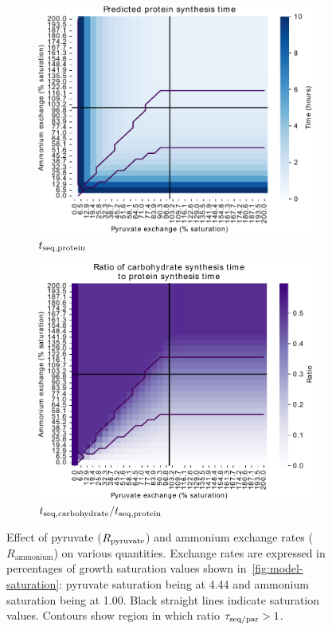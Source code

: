 \begin{figure}
  \begin{subfigure}[t]{0.45\textwidth}
  \centering
    \includegraphics[width=\linewidth]{ec_grid_pyr_amm_prot}
    \caption{
      $t_{\mathrm{seq},\mathrm{protein}}$
    }
    \label{fig:model-grid-pyr-prot}
  \end{subfigure}%
  \begin{subfigure}[t]{0.45\textwidth}
  \centering
    \includegraphics[width=\linewidth]{ec_grid_pyr_amm_carb_to_prot}
    \caption{
      $t_{\mathrm{seq},\mathrm{carbohydrate}}/t_{\mathrm{seq},\mathrm{protein}}$
    }
    \label{fig:model-grid-pyr-carb-to-prot}
  \end{subfigure}
  \caption{
    Effect of pyruvate ($R_{\mathrm{pyruvate}}$) and ammonium exchange rates ($R_{{\mathrm{ammonium}}}$) on various quantities.
    Exchange rates are expressed in percentages of growth saturation values shown in~\ref{fig:model-saturation}: pyruvate saturation being at \SI{4.44}{\mmolgdwh} and ammonium saturation being at \SI{1.00}{\mmolgdwh}.
    Black straight lines indicate saturation values.
    Contours show region in which ratio $\tau_{\mathrm{seq}/\mathrm{par}} > 1$.
  }
  \label{fig:model-grid-pyr}
\end{figure}

